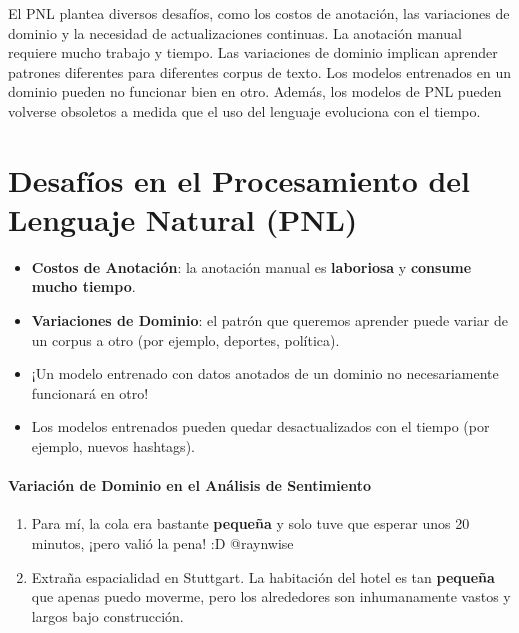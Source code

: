 \documentclass{book}
\begin{document}
El PNL plantea diversos desafíos, como los costos de anotación, las variaciones de dominio y la necesidad de actualizaciones continuas. La anotación manual requiere mucho trabajo y tiempo. Las variaciones de dominio implican aprender patrones diferentes para diferentes corpus de texto. Los modelos entrenados en un dominio pueden no funcionar bien en otro. Además, los modelos de PNL pueden volverse obsoletos a medida que el uso del lenguaje evoluciona con el tiempo.




\section{Desafíos en el Procesamiento del Lenguaje Natural (PNL)}

\begin{itemize}
   \item \textbf{Costos de Anotación}: la anotación manual es \textbf{laboriosa} y \textbf{consume mucho tiempo}.
   \item \textbf{Variaciones de Dominio}: el patrón que queremos aprender puede variar de un corpus a otro (por ejemplo, deportes, política).

   \item ¡Un modelo entrenado con datos anotados de un dominio no necesariamente funcionará en otro!
   \item Los modelos entrenados pueden quedar desactualizados con el tiempo (por ejemplo, nuevos hashtags).
\end{itemize}

\paragraph{Variación de Dominio en el Análisis de Sentimiento}
\begin{enumerate}
   \item Para mí, la cola era bastante \textcolor[rgb]{0.00,0.00,1.00}{\textbf{pequeña}} y solo tuve que esperar unos 20 minutos, ¡pero valió la pena! :D @raynwise
   \item Extraña espacialidad en Stuttgart. La habitación del hotel es tan \textcolor[rgb]{1.00,0.00,0.00}{\textbf{pequeña}} que apenas puedo moverme, pero los alrededores son inhumanamente vastos y largos bajo construcción.
\end{enumerate}
\end{document}
